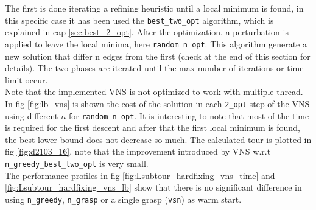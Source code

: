 The first is done iterating a refining heuristic until a local minimum is found, in this specific case it has been used the \texttt{best\_two\_opt} algorithm, which is explained in cap \ref{sec:best_2_opt}. After the optimization, a perturbation is applied to leave the local minima, here \texttt{random\_n\_opt}. This algorithm generate a new solution that differ n edges from the first (check at the end of this section for details).
The two phases are iterated until the max number of iterations or time limit occur.\\
Note that the implemented VNS is not optimized to work with multiple thread.\\
In fig \ref{fig:lb_vns} is shown the cost of the solution in each \texttt{2\_opt} step of the VNS using different $ n $ for \texttt{random\_n\_opt}. It is interesting to note that most of the time is required for the first descent and after that the first local minimum is found, the best lower bound does not decrease so much. The calculated tour is plotted in fig \ref{fig:d2103_16}, note that the improvement introduced by VNS w.r.t \texttt{n\_greedy\_best\_two\_opt} is very small.\\
The performance profiles in fig \ref{fig:Lsubtour_hardfixing_vns_time} and \ref{fig:Lsubtour_hardfixing_vns_lb} show that there is no significant difference in using \texttt{n\_greedy}, \texttt{n\_grasp} or a single grasp (\texttt{vsn}) as warm start.

